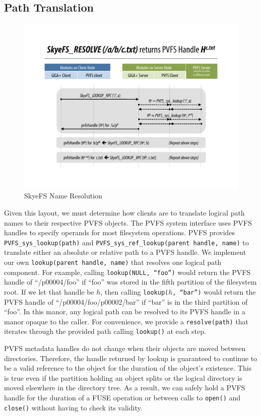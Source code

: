 \documentclass[letterpaper]{article}
\newcommand{\code}[1]{\texttt{#1}}
\begin{document}
\subsection{Path Translation}
\begin{figure}
\begin{center}
\includegraphics[scale=0.4]{figure-resolve}
\end{center}
\caption{SkyeFS Name Resolution}
\end{figure}
Given this layout, we must determine how clients are to translate logical path
names to their respective PVFS objects.  The PVFS system interface uses PVFS
handles to specify operands for most filesystem operations.  PVFS provides
\code{PVFS\_\-sys\_\-lookup(path)} and
\code{PVFS\_\-sys\_\-ref\_\-lookup(parent handle, name)} to translate either
an absolute or relative path to a PVFS handle.  We implement our own
\code{lookup(parent handle, name)} that resolves one logical path component.
For example, calling \code{lookup(NULL, ``foo'')} would return the PVFS handle
of ``/p00004/foo'' if ``foo'' was stored in the fifth partition of the
filesystem root.  If we let that handle be $h$, then calling \code{lookup($h$,
``bar'')} would return the PVFS handle of ``/p00004/foo/p00002/bar'' if
``bar'' is in the third partition of ``foo''.  In this manor, any logical path
can be resolved to its PVFS handle in a manor opaque to the caller.  For
convenience, we provide a \code{resolve(path)} that iterates through the
provided path calling \code{lookup()} at each step.

PVFS metadata handles do not change when their objects are moved between
directories.  Therefore, the handle returned by lookup is guaranteed to continue
to be a valid reference to the object for the duration of the object's
existence.  This is true even if the partition holding an object splits or the
logical directory is moved elsewhere in the directory tree.  As a result, we can
safely hold a PVFS handle for the duration of a FUSE operation or between calls
to \code{open()} and \code{close()} without having to check its validity.
\end{document}
